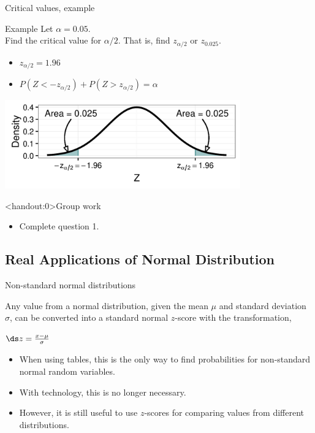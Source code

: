 \documentclass[xcolor=table]{beamer}
\begin{document}
\begin{frame}{Critical values, example}
\begin{exampleblock}{Example}
Let $\alpha = 0.05$.\\
\medskip
Find the critical value for $\alpha/2$. That is, find $z_{\alpha/2}$ or $z_{0.025}$.
\begin{itemize}
\pause\item $z_{\alpha/2} = 1.96$
\item $P(Z < -z_{\alpha/2}) + P(Z > z_{\alpha/2}) = \alpha$
\end{itemize}
\end{exampleblock}
\smallskip
{\centering
\includegraphics[width=4in]{../images/ch6_crit2}
\par}

\end{frame}

\begin{frame}<handout:0>{Group work}
\begin{block}{}
\large
\begin{itemize}
\item Complete question 1.
\end{itemize}
\end{block}
\end{frame}

\subsection{Real Applications of  Normal Distribution}

\begin{frame}{Non-standard normal distributions}
\begin{block}{}
Any value from a normal distribution, given the mean $\mu$ and standard deviation $\sigma$, can be converted into a standard normal $z$-score with the transformation,\\
\smallskip
{\centering
$\ds z = \frac {x - \mu}{\sigma}$
\par}
\smallskip
\begin{itemize}
\pause\item When using tables, this is the only way to find probabilities for non-standard normal random variables.
\pause\item With technology, this is no longer necessary.
\pause\item However, it is still useful to use $z$-scores for comparing values from different distributions.
\end{itemize}
\end{block}
\end{frame}
\end{document}
